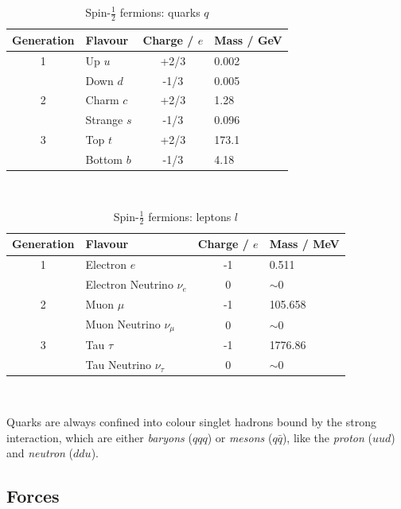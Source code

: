 		\begin{table}[ht]
			\caption{Spin-$\frac{1}{2}$ fermions: quarks $q$ \cite{pdg}}
			\label{t:tab:quark}
			\medskip
			\centering
			\begin{tabular}{clcl}\toprule
				Generation & Flavour & Charge / $e$ & Mass / GeV \\\midrule
				1    &     Up $u$      &    +2/3   & 0.002\\
	    &     Down $d$    &    -1/3   & 0.005\\
		    	2    &     Charm $c$      &    +2/3   & 1.28\\
		    	&     Strange $s$    &    -1/3   & 0.096\\
				3    &     Top $t$  &   +2/3   & 173.1\\
	    &     Bottom $b$   &   -1/3   & 4.18\\\bottomrule
			\end{tabular}\\[5pt]
		\end{table}
		\begin{table}[ht]
			\caption{Spin-$\frac{1}{2}$ fermions: leptons $l$ \cite{pdg}}
			\label{t:tab:lepton}
			\medskip
			\centering
			\begin{tabular}{clcl}\toprule
				Generation & Flavour & Charge / $e$ & Mass / MeV\\\midrule
				1    &     Electron $e$      &    -1   & 0.511\\
				&     Electron Neutrino $\nu_e$    &   0  & $\sim$0\\
				2    &     Muon $\mu$      &    -1   & 105.658\\
				&     Muon Neutrino $\nu_\mu$    &    0   & $\sim$0\\
				3    &     Tau $\tau$  &   -1   & 1776.86\\
				&     Tau Neutrino $\nu_\tau$   &   0   & $\sim$0\\\bottomrule
			\end{tabular}\\[5pt]
		\end{table}
		
		Quarks are always confined into colour singlet hadrons bound by the strong interaction, which are either \textit{baryons} ($qqq$) or \textit{mesons} ($q\bar{q}$), like the \textit{proton} ($uud$) and \textit{neutron} ($ddu$). 
		
	\subsection{Forces}
		
